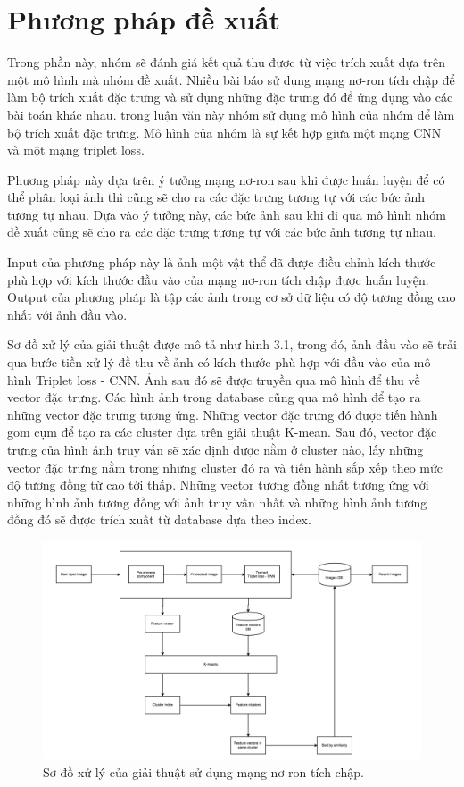 \documentclass[a4paper,14pt]{extreport}
\begin{document}
\section{ Phương pháp đề xuất }

Trong phần này, nhóm sẽ đánh giá kết quả thu được từ việc trích xuất dựa trên một mô hình mà nhóm đề xuất. Nhiều bài báo sử dụng mạng nơ-ron tích chập để làm bộ trích xuất đặc trưng và sử dụng những đặc trưng đó để ứng dụng vào các bài toán khác nhau. trong luận văn này nhóm sử dụng mô hình của nhóm để làm bộ trích xuất đặc trưng. Mô hình của nhóm là sự kết hợp giữa một mạng CNN và một mạng triplet loss.

Phương pháp này dựa trên ý tưởng mạng nơ-ron sau khi được huấn luyện để có thể phân loại ảnh thì cũng sẽ cho 
ra các đặc trưng tương tự với các bức ảnh tương tự nhau. Dựa vào ý tưởng này, các bức ảnh sau khi đi qua mô hình nhóm đề xuất cũng sẽ cho ra các đặc trưng tương tự với các bức ảnh tương tự nhau.

Input của phương pháp này là ảnh một vật thể đã được điều chỉnh kích thước phù hợp với kích thước đầu vào của mạng nơ-ron tích chập được huấn luyện. Output của phương pháp là tập các ảnh trong cơ sở dữ liệu có độ tương đồng cao nhất với ảnh đầu vào.

Sơ đồ xử lý của giải thuật được mô tả như hình 3.1, trong đó, ảnh đầu vào sẽ trải qua bước tiền xử lý đề thu về ảnh có kích thước phù hợp với đầu vào của mô hình Triplet loss - CNN. Ảnh sau đó sẽ được truyền qua mô hình để thu về vector đặc trưng. Các hình ảnh trong database cũng qua mô hình để tạo ra những vector đặc trưng tương ứng. Những vector đặc trưng đó được tiến hành gom cụm để tạo ra các cluster dựa trên giải thuật K-mean. Sau đó, vector đặc trưng của hình ảnh truy vấn sẽ xác định được nằm ở cluster nào, lấy những vector đặc trưng nằm trong những cluster đó ra và tiến hành sắp xếp theo mức độ tương đồng từ cao tới thấp. Những vector tương đồng nhất tương ứng với những hình ảnh tương đồng với ảnh truy vấn nhất và những hình ảnh tương đồng đó sẽ được trích xuất từ database dựa theo index.

\begin{figure}  
    \centering
    \includegraphics[scale=0.4]{img/CBIR-system.png}
    \caption{Sơ đồ xử lý của giải thuật sử dụng mạng nơ-ron tích chập.}
\end{figure}    
\end{document}
